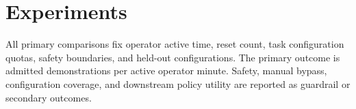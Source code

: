 \section{Experiments}
\label{sec:experiments}

All primary comparisons fix operator active time, reset count, task
configuration quotas, safety boundaries, and held-out configurations. The
primary outcome is admitted demonstrations per active operator minute. Safety,
manual bypass, configuration coverage, and downstream policy utility are
reported as guardrail or secondary outcomes.
